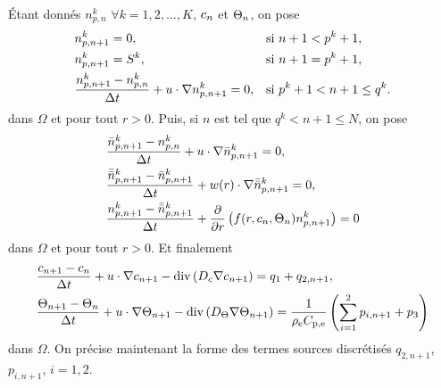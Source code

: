 Étant donnés $n_{p,n}^k$ $\forall k=1, 2, \dots, K$,
$c_n$ et $\Theta_n$, on pose
\begin{align}
  & n_{p,n+1}^k = 0, &&\text{si }  n + 1 < p^k + 1,\label{eq:splitting-np1-init}\\
  & n_{p,n+1}^k = S^k, &&\text{si } n + 1 = p^k + 1,\\
  & \frac{n_{p,n+1}^k - n_{p,n}^k}{\Delta t} + u\cdot\nabla n_{p,n+1}^k = 0, && \text{si } p^k + 1 < n+1 \leq q^k.\label{eq:splitting-np1-u}
\end{align}
dans $\Omega$ et pour tout $r > 0$. Puis, si $n$ est tel que $q^k < n
+ 1 \leq N$, on pose
\begin{align}
  &\displaystyle\frac{\bar n_{p,n+1}^k - n_{p,n}^k}{\Delta t} +
  u\cdot\nabla \bar n_{p,n+1}^k = 0,\label{eq:splitting-np2-u}\\
  &\displaystyle\frac{\bar{\bar n}_{p,n+1}^k - \bar n_{p,n+1}^k}{\Delta t} +
  w(r)\cdot\nabla \bar{\bar n}_{p,n+1}^k = 0,\label{eq:splitting-np2-w}\\
    &\displaystyle\frac{n_{p,n+1}^k - \bar{\bar n}_{p,n+1}^k}{\Delta t} +
    \displaystyle\frac{\partial}{\partial r}\left( f(r,
      c_n, \Theta_n)n_{p,n+1}^k \right) =
    0\label{eq:splitting-dissolution}
\end{align}
dans $\Omega$ et pour tout $r > 0$. Et finalement
\begin{align}
&\frac{c_{n+1} - c_{n}}{\Delta t} + u\cdot\nabla
c_{n+1} - \mathrm{div}\left( D_c \nabla c_{n+1} \right) = q_1
+ q_{2,n+1},\label{eq:splitting-c} \\
&\frac{\Theta_{n+1} - \Theta_{n}}{\Delta t} + u\cdot\nabla
\Theta_{n+1} - \mathrm{div}\left( D_\Theta \nabla \Theta_{n+1} \right) =
\frac{1}{\rho_\mathrm{e} C_{\mathrm{p,e}}}\left( \sum_{i =
    1}^2p_{i,n+1} + p_3 \right)\label{eq:splitting-t}
\end{align}
dans $\Omega$. On précise maintenant la forme des termes sources
discrétisés $q_{2,n+1}$, $p_{i,n+1}$, $i = 1,2$.

